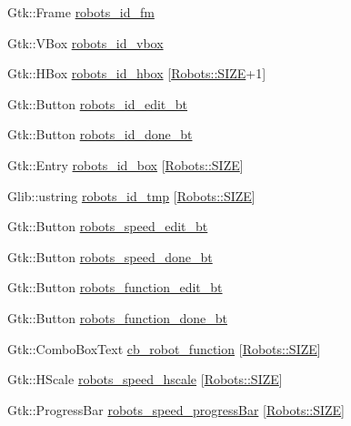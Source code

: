 \begin{DoxyCompactItemize}
\item 
Gtk\+::\+Frame \hyperlink{class_robot_g_u_i_a64bb163eaa38fd00aee4db7428d3aae7}{robots\+\_\+id\+\_\+fm}
\item 
Gtk\+::\+V\+Box \hyperlink{class_robot_g_u_i_ac64edc58bf0527d05a792fbe59237f32}{robots\+\_\+id\+\_\+vbox}
\item 
Gtk\+::\+H\+Box \hyperlink{class_robot_g_u_i_a9cbad34535e54602bf18610c56e003a8}{robots\+\_\+id\+\_\+hbox} \mbox{[}\hyperlink{class_robots_ae9df2f1d345ad6740f0459956cdd4712}{Robots\+::\+S\+I\+ZE}+1\mbox{]}
\item 
Gtk\+::\+Button \hyperlink{class_robot_g_u_i_aa74c3aa318e937124b6bd8cc1139ffbd}{robots\+\_\+id\+\_\+edit\+\_\+bt}
\item 
Gtk\+::\+Button \hyperlink{class_robot_g_u_i_ab69f2927774ee6e1feef6e1e175bf5ba}{robots\+\_\+id\+\_\+done\+\_\+bt}
\item 
Gtk\+::\+Entry \hyperlink{class_robot_g_u_i_a1e475a8f99d5f0b3b29286731ddf0550}{robots\+\_\+id\+\_\+box} \mbox{[}\hyperlink{class_robots_ae9df2f1d345ad6740f0459956cdd4712}{Robots\+::\+S\+I\+ZE}\mbox{]}
\item 
Glib\+::ustring \hyperlink{class_robot_g_u_i_ab5811cf4bb3982cdba9adf282eb52517}{robots\+\_\+id\+\_\+tmp} \mbox{[}\hyperlink{class_robots_ae9df2f1d345ad6740f0459956cdd4712}{Robots\+::\+S\+I\+ZE}\mbox{]}
\item 
Gtk\+::\+Button \hyperlink{class_robot_g_u_i_aeb9008eb20d42d90fe39564179598d6d}{robots\+\_\+speed\+\_\+edit\+\_\+bt}
\item 
Gtk\+::\+Button \hyperlink{class_robot_g_u_i_accc677ab2d9cd534389956e6d41ee55c}{robots\+\_\+speed\+\_\+done\+\_\+bt}
\item 
Gtk\+::\+Button \hyperlink{class_robot_g_u_i_ac474c7d61bd07aaf26f75acb691e2971}{robots\+\_\+function\+\_\+edit\+\_\+bt}
\item 
Gtk\+::\+Button \hyperlink{class_robot_g_u_i_a17db9c0ad94bd601734b87c6aff3fcf0}{robots\+\_\+function\+\_\+done\+\_\+bt}
\item 
Gtk\+::\+Combo\+Box\+Text \hyperlink{class_robot_g_u_i_ab1e977d6ae4bcf57e4306f017695eeeb}{cb\+\_\+robot\+\_\+function} \mbox{[}\hyperlink{class_robots_ae9df2f1d345ad6740f0459956cdd4712}{Robots\+::\+S\+I\+ZE}\mbox{]}
\item 
Gtk\+::\+H\+Scale \hyperlink{class_robot_g_u_i_a25c9dbce938a0b6fa4de5c7174d062af}{robots\+\_\+speed\+\_\+hscale} \mbox{[}\hyperlink{class_robots_ae9df2f1d345ad6740f0459956cdd4712}{Robots\+::\+S\+I\+ZE}\mbox{]}
\item 
Gtk\+::\+Progress\+Bar \hyperlink{class_robot_g_u_i_a2c5103a4c119635536213e8c9dd6fc3f}{robots\+\_\+speed\+\_\+progress\+Bar} \mbox{[}\hyperlink{class_robots_ae9df2f1d345ad6740f0459956cdd4712}{Robots\+::\+S\+I\+ZE}\mbox{]}
\end{DoxyCompactItemize}


